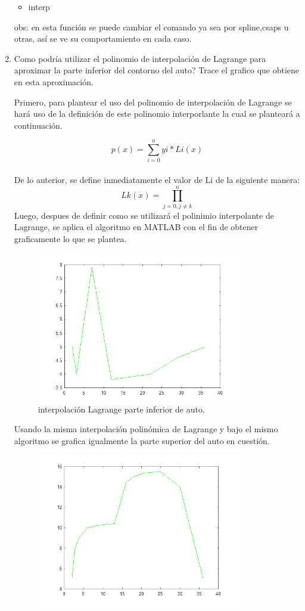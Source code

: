\documentclass{udpreport}
\begin{document}
\begin{enumerate}
\begin{itemize}
\item interp
\end{itemize}
obs: en esta función se puede cambiar el comando ya sea por spline,csaps u otras, así se ve su comportamiento en cada caso.
\item Como podría utilizar el polinomio de interpolación de Lagrange para aproximar la parte inferior del contorno del auto? Trace el grafico que obtiene en esta aproximación.

Primero, para plantear el uso del polinomio de interpolación de Lagrange se hará uso de la definición de este polinomio interporlante la cual se planteará a continuación.

 \begin{equation}
 p(x)=\sum_{i=0}^n yi*Li(x)
\end{equation}
\\ De lo anterior, se define inmediatamente el valor de Li de la siguiente manera:
 \begin{equation}
 Lk(x)=\prod_{j=0,j\not=k}^{n}
\end{equation}
Luego, despues de definir como se utilizará el polinimio interpolante de Lagrange, se aplica el algoritmo en MATLAB con el fin de obtener graficamente lo que se plantea. 
\begin{figure}[H]
    \centering
    \includegraphics[width=9cm]{int_lagrange_inf}
    \caption{interpolación Lagrange parte inferior de auto.} \label{fig:int_lagrange_inf}
\end{figure}
Usando la misma interpolación polinómica de Lagrange y bajo el mismo algoritmo se grafica igualmente la parte superior del auto en cuestión.
\begin{figure}[H]
    \centering
    \includegraphics[width=9cm]{int_lagrange_aprox_parte_sup}

\end{figure}
\end{enumerate}
\end{document}
